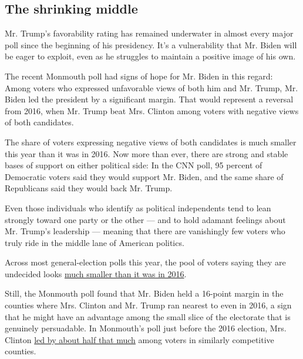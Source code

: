 \hypertarget{the-shrinking-middle}{%
\subsection{The shrinking middle}\label{the-shrinking-middle}}

Mr. Trump's favorability rating has remained underwater in almost every
major poll since the beginning of his presidency. It's a vulnerability
that Mr. Biden will be eager to exploit, even as he struggles to
maintain a positive image of his own.

The recent Monmouth poll had signs of hope for Mr. Biden in this regard:
Among voters who expressed unfavorable views of both him and Mr. Trump,
Mr. Biden led the president by a significant margin. That would
represent a reversal from 2016, when Mr. Trump beat Mrs. Clinton among
voters with negative views of both candidates.

The share of voters expressing negative views of both candidates is much
smaller this year than it was in 2016. Now more than ever, there are
strong and stable bases of support on either political side: In the CNN
poll, 95 percent of Democratic voters said they would support Mr. Biden,
and the same share of Republicans said they would back Mr. Trump.

Even those individuals who identify as political independents tend to
lean strongly toward one party or the other --- and to hold adamant
feelings about Mr. Trump's leadership --- meaning that there are
vanishingly few voters who truly ride in the middle lane of American
politics.

Across most general-election polls this year, the pool of voters saying
they are undecided looks
\href{https://www.nytimes3xbfgragh.onion/2020/05/12/upshot/polls-2020-trump-biden.html?campaign_id=29\&emc=edit_up_20200514\&instance_id=18471\&nl=the-upshot\&regi_id=73378695\&segment_id=27795\&te=1\&user_id=a675e15731785ae5715f1c3b5549c62e}{much
smaller than it was in 2016}.

Still, the Monmouth poll found that Mr. Biden held a 16-point margin in
the counties where Mrs. Clinton and Mr. Trump ran nearest to even in
2016, a sign that he might have an advantage among the small slice of
the electorate that is genuinely persuadable. In Monmouth's poll just
before the 2016 election, Mrs. Clinton
\href{https://www.monmouth.edu/polling-institute/documents/monmouthpoll_us_110716.pdf/}{led
by about half that much} among voters in similarly competitive counties.

